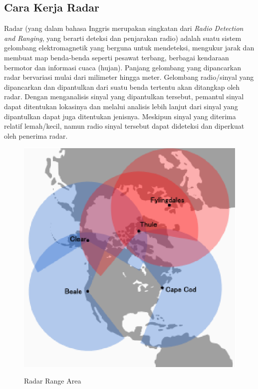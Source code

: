 \documentclass[9pt,twocolumn,twoside]{Gunadarma}
\begin{document}
\subsection{Cara Kerja Radar}
Radar (yang dalam bahasa Inggris merupakan singkatan dari \textit{Radio Detection and Ranging}, yang berarti deteksi dan penjarakan radio) adalah suatu sistem gelombang elektromagnetik yang berguna untuk mendeteksi, mengukur jarak dan membuat map benda-benda seperti pesawat terbang, berbagai kendaraan bermotor dan informasi cuaca (hujan). Panjang gelombang yang dipancarkan radar bervariasi mulai dari milimeter hingga meter. Gelombang radio/sinyal yang dipancarkan dan dipantulkan dari suatu benda tertentu akan ditangkap oleh radar. Dengan menganalisis sinyal yang dipantulkan tersebut, pemantul sinyal dapat ditentukan lokasinya dan melalui analisis lebih lanjut dari sinyal yang dipantulkan dapat juga ditentukan jenisnya. Meskipun sinyal yang diterima relatif lemah/kecil, namun radio sinyal tersebut dapat dideteksi dan diperkuat oleh penerima radar.


\begin{figure}[htbp]
\begin{center}
\includegraphics[width=1\columnwidth]{radar.eps} \label{fig:1-noFCase1}
\end{center}
\caption{Radar Range Area}
\end{figure}
\end{document}
